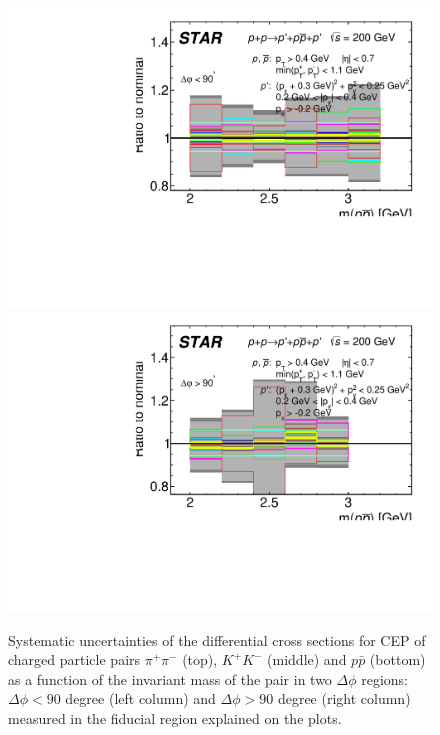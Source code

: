 \begin{figure}[h]
\newline
\hspace*{5pt}
\includegraphics[width=.46\textwidth,page=1]{graphics/systematics/FinalResult_InvMass_DeltaPhiBin1_proton_Systematics2.pdf}
\hfill
\includegraphics[width=.46\textwidth,page=1]{graphics/systematics/FinalResult_InvMass_DeltaPhiBin2_proton_Systematics2.pdf}
\hspace*{5pt}
%
\caption{Systematic uncertainties of the differential cross sections for CEP of charged particle pairs $\pi^+\pi^-$ (top), $K^+K^-$ (middle) and $p\bar{p}$ (bottom) as a function of the invariant mass of the pair in two $\Delta\phi$ regions: $\Delta\phi<90$ degree (left column) and $\Delta\phi>90$ degree (right column) measured in the fiducial region explained on the plots.}
\label{systematics_3}
\end{figure}
